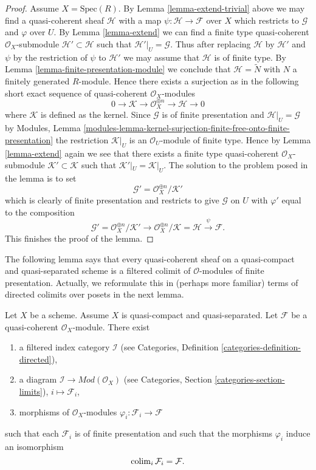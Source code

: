 \begin{proof}
\medskip\noindent
Assume $X = \text{Spec}(R)$.
By Lemma \ref{lemma-extend-trivial} above we may
find a quasi-coherent sheaf $\mathcal{H}$ with
a map $\psi : \mathcal{H} \to \mathcal{F}$ over $X$
which restricts to $\mathcal{G}$ and $\varphi$ over $U$.
By Lemma \ref{lemma-extend} we can find a finite type
quasi-coherent $\mathcal{O}_X$-submodule
$\mathcal{H}' \subset \mathcal{H}$
such that $\mathcal{H}'|_U = \mathcal{G}$. Thus after
replacing $\mathcal{H}$ by $\mathcal{H}'$
and $\psi$ by the restriction of $\psi$ to $\mathcal{H}'$
we may assume that $\mathcal{H}$ is of finite type.
By Lemma \ref{lemma-finite-presentation-module}
we conclude that $\mathcal{H} = \widetilde{N}$ with
$N$ a finitely generated $R$-module. Hence there exists a surjection
as in the following short exact sequence of
quasi-coherent $\mathcal{O}_X$-modules
$$
0 \to \mathcal{K} \to \mathcal{O}_X^{\oplus n} \to \mathcal{H} \to 0
$$
where $\mathcal{K}$ is defined as the kernel.
Since $\mathcal{G}$ is of finite presentation and
$\mathcal{H}|_U = \mathcal{G}$ by
Modules, Lemma
\ref{modules-lemma-kernel-surjection-finite-free-onto-finite-presentation}
the restriction $\mathcal{K}|_U$ is
an $\mathcal{O}_U$-module of finite type. Hence by Lemma \ref{lemma-extend}
again we see that there exists a finite type quasi-coherent
$\mathcal{O}_X$-submodule $\mathcal{K}' \subset \mathcal{K}$ such
that $\mathcal{K}'|_U = \mathcal{K}|_U$. The solution to the problem
posed in the lemma is to set
$$
\mathcal{G}' = \mathcal{O}_X^{\oplus n}/\mathcal{K}'
$$
which is clearly of finite presentation and restricts to give $\mathcal{G}$
on $U$ with $\varphi'$ equal to the composition
$$
\mathcal{G}' = \mathcal{O}_X^{\oplus n}/\mathcal{K}'
\to \mathcal{O}_X^{\oplus n}/\mathcal{K} = \mathcal{H} \xrightarrow{\psi}
\mathcal{F}.
$$
This finishes the proof of the lemma.
\end{proof}

\noindent
The following lemma says that every quasi-coherent sheaf on a quasi-compact
and quasi-separated scheme is a filtered colimit of $\mathcal{O}$-modules
of finite presentation. Actually, we reformulate this in (perhaps more
familiar) terms of directed colimits over posets in the next lemma.

\begin{lemma}
\label{lemma-directed-colimit-diagram-finite-presentation}
Let $X$ be a scheme. Assume $X$ is quasi-compact and quasi-separated.
Let $\mathcal{F}$ be a quasi-coherent $\mathcal{O}_X$-module.
There exist
\begin{enumerate}
\item a filtered index category $\mathcal{I}$ (see
Categories, Definition \ref{categories-definition-directed}),
\item a diagram $\mathcal{I} \to \textit{Mod}(\mathcal{O}_X)$ (see
Categories, Section \ref{categories-section-limits}),
$i \mapsto \mathcal{F}_i$,
\item morphisms of $\mathcal{O}_X$-modules
$\varphi_i : \mathcal{F}_i \to \mathcal{F}$
\end{enumerate}
such that each $\mathcal{F}_i$ is of finite presentation
and such that the morphisms $\varphi_i$ induce an isomorphism
$$
\mathop{\rm colim}\nolimits_i \mathcal{F}_i
=
\mathcal{F}.
$$
\end{lemma}

